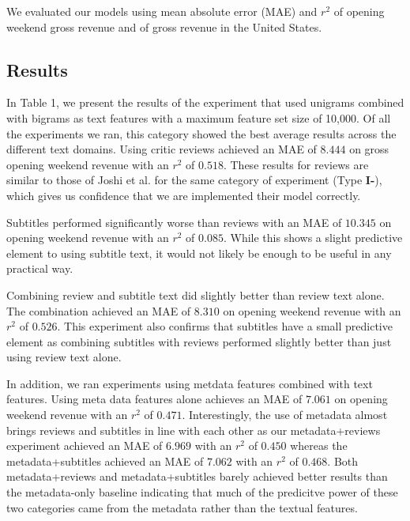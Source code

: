 \documentclass[11pt]{article}
\begin{document}
We evaluated our models using mean absolute error (MAE) and $r^2$ of opening weekend gross
revenue and of gross revenue in the United States. 

\subsection{Results}
In Table 1, we present the results of the experiment that used unigrams combined with
bigrams as text features with a maximum feature set size of 10,000. Of all the experiments
we ran, this category showed the best average results across the different text domains.
Using critic reviews achieved an MAE of $8.444$ on gross opening weekend revenue with
an $r^2$ of $0.518$. These results for reviews are similar to those of Joshi et al. for
the same category of experiment (Type \textbf{I-}), which gives us confidence that we
are implemented their model correctly.

Subtitles performed significantly worse than reviews with an MAE of $10.345$ on opening
weekend revenue with an $r^2$ of $0.085$. While this shows a slight predictive element
to using subtitle text, it would not likely be enough to be useful in any practical way.

Combining review and subtitle text did slightly better than review text alone. The
combination achieved an MAE of $8.310$ on opening weekend revenue with an $r^2$ of
$0.526$. This experiment also confirms that subtitles have a small predictive element
as combining subtitles with reviews performed slightly better than just using review text
alone.

In addition, we ran experiments using metdata features combined with text features. Using
meta data features alone achieves an MAE of $7.061$ on opening weekend revenue with an
$r^2$ of $0.471$. Interestingly, the use of metadata almost brings reviews and subtitles
in line with each other as our metadata+reviews experiment achieved an MAE of $6.969$ with
an $r^2$ of $0.450$ whereas the metadata+subtitles achieved an MAE of $7.062$ with an
$r^2$ of $0.468$. Both metadata+reviews and metadata+subtitles barely achieved better
results than the metadata-only baseline indicating that much of the predicitve power of
these two categories came from the metadata rather than the textual features.
\end{document}
